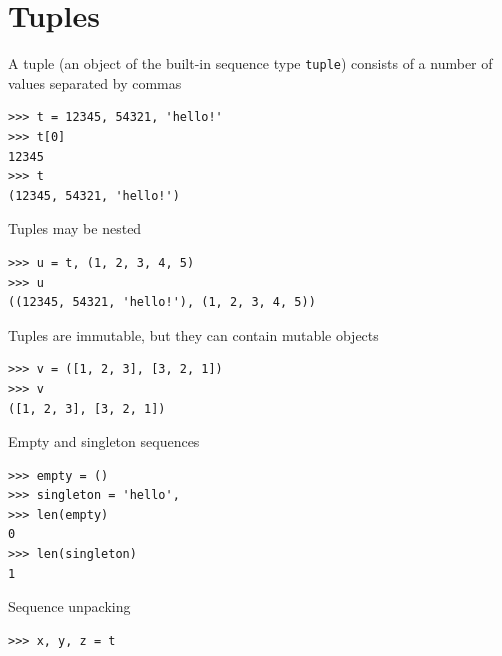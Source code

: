 \documentclass[8pt,a4paper,compress]{beamer}
\begin{document}
\section{Tuples}
\begin{frame}[fragile]
\pause

A tuple (an object of the built-in sequence type \lstinline{tuple}) consists of a number of values separated by commas

\smallskip

\begin{lstlisting}[language={},style=focusin]
>>> t = 12345, 54321, 'hello!'
>>> t[0]
12345
>>> t
(12345, 54321, 'hello!')
\end{lstlisting}

\pause\bigskip

Tuples may be nested

\smallskip

\begin{lstlisting}[language={},style=focusin]
>>> u = t, (1, 2, 3, 4, 5)
>>> u
((12345, 54321, 'hello!'), (1, 2, 3, 4, 5))
\end{lstlisting}

\pause\bigskip

Tuples are immutable, but they can contain mutable objects

\smallskip

\begin{lstlisting}[language={},style=focusin]
>>> v = ([1, 2, 3], [3, 2, 1])
>>> v
([1, 2, 3], [3, 2, 1])
\end{lstlisting}

\pause\bigskip

Empty and singleton sequences

\smallskip

\begin{lstlisting}[language={},style=focusin]
>>> empty = ()
>>> singleton = 'hello', 
>>> len(empty)
0
>>> len(singleton)
1
\end{lstlisting}

\pause\bigskip

Sequence unpacking

\smallskip

\begin{lstlisting}[language={},style=focusin]
>>> x, y, z = t
\end{lstlisting}
\end{frame}
\end{document}
